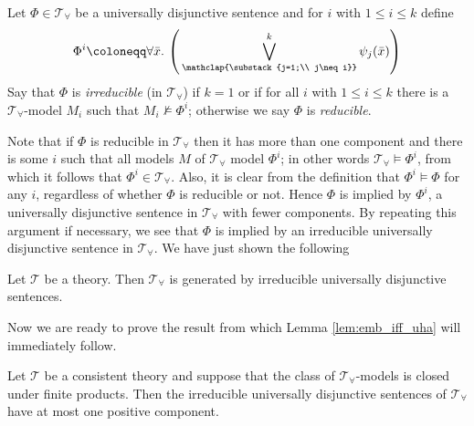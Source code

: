 Let $\Phi\in \mathcal{T}_{\forall}$ be a universally disjunctive sentence and for $i$ with $1\leq i \leq k$ define
\[
\Phi^i \coloneqq \forall \bar{x}.\, \left(\,\bigvee_{\mathclap{\substack{j=1;\\
			j\neq i}}}^k \psi_j(\bar{x})\right) 
\]
Say that $\Phi$ is \emph{irreducible} (in $\mathcal{T}_{\forall}$) if $k = 1$ or if for all $i$ with $1\leq i \leq k$ there is a $\mathcal{T}_{\forall}$-model $M_i$ such that $M_i \nvDash\Phi^i$; otherwise we say $\Phi$ is \emph{reducible}. 

Note that if $\Phi$ is reducible in $\mathcal{T}_{\forall}$ then it has more than one component and there is some $i$ such that all models $M$ of $\mathcal{T}_{\forall}$ model $\Phi^i$; in other words $\mathcal{T}_{\forall} \models \Phi^i$, from which it follows that $\Phi^i \in \mathcal{T}_{\forall}$. Also, it is clear from the definition that $\Phi^i \models \Phi$ for any $i$, regardless of whether $\Phi$ is reducible or not. Hence $\Phi$ is implied by $\Phi^i$, a universally disjunctive sentence in $\mathcal{T}_{\forall}$ with fewer components. By repeating this argument if necessary, we see that $\Phi$ is implied by an irreducible universally disjunctive sentence in $\mathcal{T}_{\forall}$. We have just shown the following
\begin{prop}
	Let $\mathcal{T}$ be a theory. Then $\mathcal{T}_{\forall}$ is generated by irreducible universally disjunctive sentences.
\end{prop}
Now we are ready to prove the result from which Lemma \ref{lem:emb_iff_uha} will immediately follow.
\begin{thm}\label{thm:th_univ_ax_horn}
	Let $\mathcal{T}$ be a consistent theory and suppose that the class of $\mathcal{T}_{\forall}$-models is closed under finite products. Then the irreducible universally disjunctive sentences of $\mathcal{T}_{\forall}$ have at most one positive component.
\end{thm}
